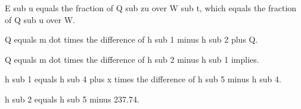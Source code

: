 E sub u equals the fraction of Q sub zu over W sub t, which equals the fraction of Q sub u over W.

Q equals m dot times the difference of h sub 1 minus h sub 2 plus Q.

Q equals m dot times the difference of h sub 2 minus h sub 1 implies.

h sub 1 equals h sub 4 plus x times the difference of h sub 5 minus h sub 4.

h sub 2 equals h sub 5 minus 237.74.